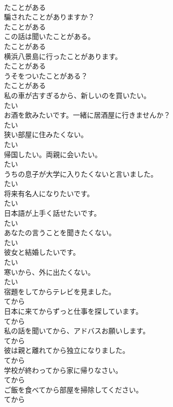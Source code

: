 \documentclass[8pt]{extreport}
\begin{document}
\begin{CJK}{UTF8}{min}
\\	たことがある
\\	騙されたことがありますか？	
\\	たことがある
\\	この話は聞いたことがある。	
\\	たことがある
\\	横浜八景島に行ったことがあります。	
\\	たことがある
\\	うそをついたことがある？	
\\	たことがある
\\	私の車が古すぎるから、新しいのを買いたい。	
\\	たい
\\	お酒を飲みたいです。一緒に居酒屋に行きませんか？	
\\	たい
\\	狭い部屋に住みたくない。	
\\	たい
\\	帰国したい。両親に会いたい。	
\\	たい
\\	うちの息子が大学に入りたくないと言いました。	
\\	たい
\\	将来有名人になりたいです。	
\\	たい
\\	日本語が上手く話せたいです。	
\\	たい
\\	あなたの言うことを聞きたくない。	
\\	たい
\\	彼女と結婚したいです。	
\\	たい
\\	寒いから、外に出たくない。	
\\	たい
\\	宿題をしてからテレビを見ました。	
\\	てから
\\	日本に来てからずっと仕事を探しています。	
\\	てから
\\	私の話を聞いてから、アドバスお願いします。	
\\	てから
\\	彼は親と離れてから独立になりました。	
\\	てから
\\	学校が終わってから家に帰りなさい。	
\\	てから
\\	ご飯を食べてから部屋を掃除してください。	
\\	てから

\end{CJK}
\end{document}
